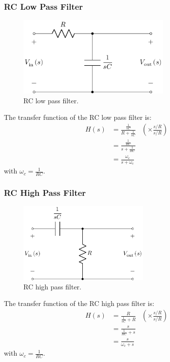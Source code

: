 \documentclass{article}
\begin{document}
\subsubsection{RC Low Pass Filter}
\begin{figure}[H]
    \centering
    \includegraphics[height = 4cm]{figures/rc_low_pass_filter.pdf}
    \caption{RC low pass filter.} %
\end{figure}
The transfer function of the RC low pass filter is:
\begin{align*}
    H\left( s \right) & = \frac{\frac{1}{sC}}{R + \frac{1}{sC}} & \left( \times \frac{s/R}{s/R} \right) \\
                      & = \frac{\frac{1}{RC}}{s + \frac{1}{RC}}                                         \\
                      & = \frac{\omega_c}{s + \omega_c}
\end{align*}
with \(\omega_c = \frac{1}{RC}\).
\subsubsection{RC High Pass Filter}
\begin{figure}[H]
    \centering
    \includegraphics[height = 4cm]{figures/rc_high_pass_filter.pdf}
    \caption{RC high pass filter.} %
\end{figure}
The transfer function of the RC high pass filter is:
\begin{align*}
    H\left( s \right) & = \frac{R}{\frac{1}{sC} + R} & \left( \times \frac{s/R}{s/R} \right) \\
                      & = \frac{s}{\frac{1}{RC} + s}                                         \\
                      & = \frac{s}{\omega_c + s}
\end{align*}
with \(\omega_c = \frac{1}{RC}\).
\end{document}
